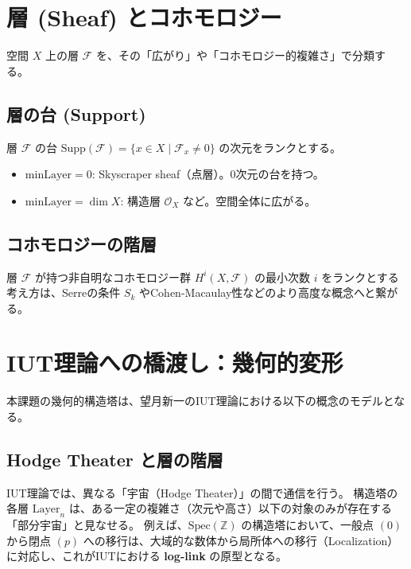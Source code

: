 \documentclass[a4paper,11pt]{ltjsarticle}
\theoremstyle{definition}
\newcommand{\Z}{\mathbb{Z}}
\newcommand{\Spec}{\mathrm{Spec}}
\newcommand{\Layer}[1]{\mathrm{Layer}_{#1}}
\newcommand{\MinLayer}{\mathrm{minLayer}}
\begin{document}
\section{層 (Sheaf) とコホモロジー}

空間 $X$ 上の層 $\mathscr{F}$ を、その「広がり」や「コホモロジー的複雑さ」で分類する。

\subsection{層の台 (Support)}
層 $\mathscr{F}$ の台 $\mathrm{Supp}(\mathscr{F}) = \{x \in X \mid \mathscr{F}_x \neq 0\}$ の次元をランクとする。
\begin{itemize}
    \item $\MinLayer = 0$: Skyscraper sheaf（点層）。0次元の台を持つ。
    \item $\MinLayer = \dim X$: 構造層 $\mathcal{O}_X$ など。空間全体に広がる。
\end{itemize}

\subsection{コホモロジーの階層}
層 $\mathscr{F}$ が持つ非自明なコホモロジー群 $H^i(X, \mathscr{F})$ の最小次数 $i$ をランクとする考え方は、Serreの条件 $S_k$ やCohen-Macaulay性などのより高度な概念へと繋がる。

\section{IUT理論への橋渡し：幾何的変形}

本課題の幾何的構造塔は、望月新一のIUT理論における以下の概念のモデルとなる。

\subsection{Hodge Theater と層の階層}
IUT理論では、異なる「宇宙（Hodge Theater）」の間で通信を行う。
構造塔の各層 $\Layer{n}$ は、ある一定の複雑さ（次元や高さ）以下の対象のみが存在する「部分宇宙」と見なせる。
例えば、$\Spec(\Z)$ の構造塔において、一般点 $(0)$ から閉点 $(p)$ への移行は、大域的な数体から局所体への移行（Localization）に対応し、これがIUTにおける \textbf{log-link} の原型となる。
\end{document}
